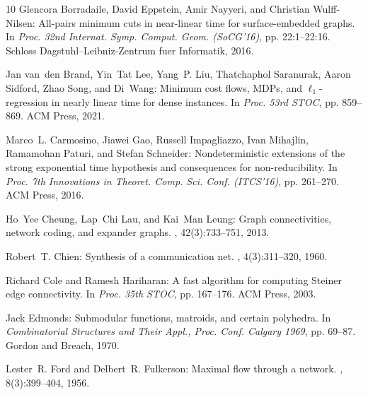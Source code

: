 \begin{thebibliography}{10}
{\sc Glencora Borradaile, David Eppstein, Amir Nayyeri, and Christian
  Wulff{-}Nilsen}: All-pairs minimum cuts in near-linear time for
  surface-embedded graphs.
\newblock In {\em Proc. 32nd Internat. Symp. Comput. Geom. (SoCG'16)}, pp.
  22:1--22:16. Schloss Dagstuhl--Leibniz-Zentrum fuer Informatik, 2016.

{\sc Jan van~den Brand, Yin~Tat Lee, Yang~P. Liu, Thatchaphol Saranurak, Aaron
  Sidford, Zhao Song, and Di~Wang}: Minimum cost flows, {MDPs}, and
  $\ell_1$-regression in nearly linear time for dense instances.
\newblock In {\em Proc. 53rd STOC}, pp. 859--869. ACM Press, 2021.
\newblock [\epfmtdoi{10.1145/3406325.3451108}]

{\sc Marco~L. Carmosino, Jiawei Gao, Russell Impagliazzo, Ivan Mihajlin,
  Ramamohan Paturi, and Stefan Schneider}: Nondeterministic extensions of the
  strong exponential time hypothesis and consequences for non-reducibility.
\newblock In {\em Proc. 7th Innovations in Theoret. Comp. Sci. Conf.
  (ITCS'16)}, pp. 261--270. ACM Press, 2016.
\newblock [\epfmtdoi{10.1145/2840728.2840746}]

{\sc Ho~Yee Cheung, Lap~Chi Lau, and Kai~Man Leung}: Graph connectivities,
  network coding, and expander graphs.
, 42(3):733--751, 2013.
\newblock [\epfmtdoi{10.1137/110844970}]

{\sc Robert~T. Chien}: Synthesis of a communication net.
, 4(3):311--320, 1960.
\newblock [\epfmtdoi{10.1147/rd.43.0311}]

{\sc Richard Cole and Ramesh Hariharan}: A fast algorithm for computing
  {S}teiner edge connectivity.
\newblock In {\em Proc. 35th STOC}, pp. 167--176. ACM Press, 2003.
\newblock [\epfmtdoi{10.1145/780542.780568}]

{\sc Jack Edmonds}: Submodular functions, matroids, and certain polyhedra.
\newblock In {\em Combinatorial Structures and Their Appl., Proc. Conf. Calgary
  1969}, pp. 69--87. Gordon and Breach, 1970.
\newblock [\epfmtdoi{10.1007/3-540-36478-1\_2}]

{\sc Lester~R. Ford and Delbert~R. Fulkerson}: Maximal flow through a network.
, 8(3):399--404, 1956.


\end{thebibliography}
